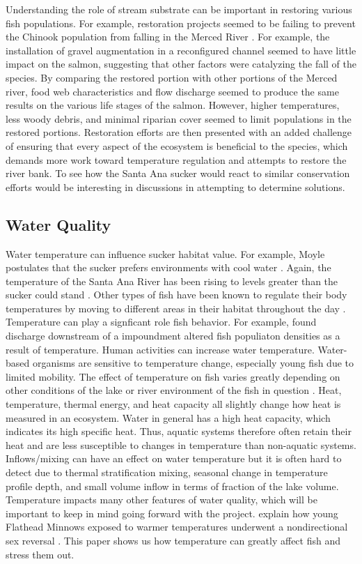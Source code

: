 \documentclass{article}
\begin{document}
Understanding the role of stream substrate can be important in restoring various fish populations. For example, restoration projects seemed to be failing to prevent the Chinook population from falling in the Merced River \citep{albertson13}. For example, the installation of gravel augmentation in a reconfigured channel seemed to have little impact on the salmon, suggesting that other factors were catalyzing the fall of the species. By comparing the restored portion with other portions of the Merced river, food web characteristics and flow discharge seemed to produce the same results on the various life stages of the salmon. However, higher temperatures, less woody debris, and minimal riparian cover seemed to limit populations in the restored portions. Restoration efforts are then presented with an added challenge of ensuring that every aspect of the ecosystem is beneficial to the species, which demands more work toward temperature regulation and attempts to restore the river bank. To see how the Santa Ana sucker would react to similar conservation efforts would be interesting in discussions in attempting to determine solutions.

\subsection{Water Quality}

Water temperature can influence sucker habitat value. For example, Moyle postulates that the sucker prefers environments with cool water \citep{moyle2002inland}. Again, the temperature of the Santa Ana River has been rising to levels greater than the sucker could stand \citep{REF}. Other types of fish have been known to regulate their body temperatures by moving to different areas in their habitat throughout the day \citep{matthews1994cool}. Temperature can play a signficant role fish behavior. For example, \citet{sadler1980effect} found discharge downstream of a impoundment altered fish populiaton densities as a result of temperature. Human activities can increase water temperature. Water-based organisms are sensitive to temperature change, especially young fish due to limited mobility. The effect of temperature on fish varies greatly depending on other conditions of the lake or river environment of the fish in question \citep{loshuertos16}. Heat, temperature, thermal energy, and heat capacity all slightly change how heat is measured in an ecosystem. Water in general has a high heat capacity, which indicates its high specific heat. Thus, aquatic systems therefore often retain their heat and are less susceptible to changes in temperature than non-aquatic systems. Inflows/mixing can have an effect on water temperature but it is often hard to detect due to thermal stratification mixing, seasonal change in temperature profile depth, and small volume inflow in terms of fraction of the lake volume. Temperature impacts many other features of water quality, which will be important to keep in mind going forward with the project. \citet{coulter2015fluctuating} explain how young Flathead Minnows exposed to warmer temperatures underwent a nondirectional sex reversal . This paper shows us how temperature can greatly affect fish and stress them out. 
\end{document}
